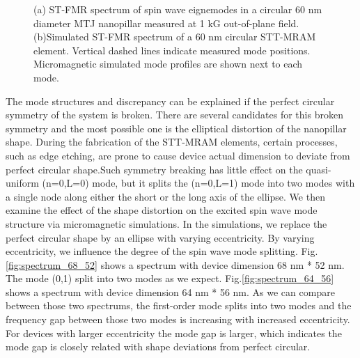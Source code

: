 \begin{figure}[h!]
\centering     
{}
\caption{(a) ST-FMR spectrum of spin wave eignemodes in a circular 60 nm diameter MTJ nanopillar measured at 1 kG out-of-plane field. (b)Simulated ST-FMR spectrum of a 60 nm circular STT-MRAM element. Vertical dashed lines indicate measured mode positions. Micromagnetic simulated mode profiles are shown next to each mode.}
\end{figure}


The mode structures and discrepancy can be explained if the perfect circular symmetry of the system is broken. There are several candidates for this broken symmetry and the most possible one is the elliptical distortion of the nanopillar shape. During the fabrication of the STT-MRAM elements, certain processes, such as edge etching, are prone to cause device actual dimension to deviate from perfect circular shape.Such symmetry breaking has little effect on the quasi-uniform (n=0,L=0) mode, but it splits the (n=0,L=1) mode into two modes with a single node along either the short or the long axis of the ellipse. We then examine the effect of the shape distortion on the excited spin wave mode structure via micromagnetic simulations.  In the simulations, we replace the perfect circular shape by an ellipse with varying eccentricity. By varying eccentricity, we influence the degree of the spin wave mode splitting. Fig.\ref{fig:spectrum_68_52} shows a spectrum with device dimension 68 nm * 52 nm. The mode (0,1) split into two modes as we expect. Fig.\ref{fig:spectrum_64_56} shows a spectrum with device dimension 64 nm * 56 nm. As we can compare between those two spectrums, the first-order mode splits into two modes and the frequency gap between those two modes is increasing with increased eccentricity. For devices with larger eccentricity the mode gap is larger, which indicates the mode gap is closely related with shape deviations from perfect circular.

